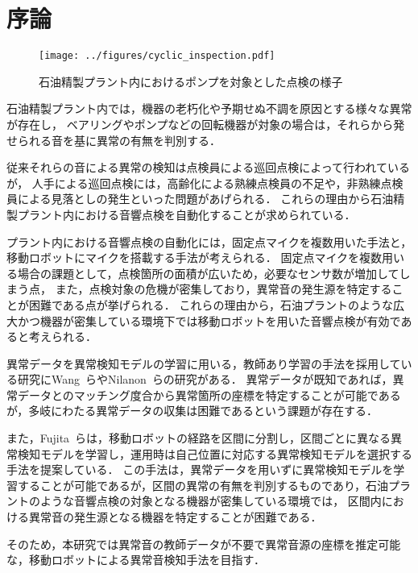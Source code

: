 \documentclass[../main]{subfiles}
\begin{document}
\graphicspath{{../figures/}}




\section{序論}

\begin{figure}[tb]
  \centering
  \texttt{[image: ../figures/cyclic\_inspection.pdf]}
  \caption{石油精製プラント内におけるポンプを対象とした点検の様子}
  \label{fig:cyclic_inspection}
\end{figure}

石油精製プラント内では，機器の老朽化や予期せぬ不調を原因とする様々な異常が存在し，
ベアリングやポンプなどの回転機器が対象の場合は，それらから発せられる音を基に異常の有無を判別する．




従来それらの音による異常の検知は点検員による巡回点検によって行われているが，
人手による巡回点検には，高齢化による熟練点検員の不足や，非熟練点検員による見落としの発生といった問題があげられる．
これらの理由から石油精製プラント内における音響点検を自動化することが求められている．


プラント内における音響点検の自動化には，固定点マイクを複数用いた手法と，移動ロボットにマイクを搭載する手法が考えられる．
固定点マイクを複数用いる場合の課題として，点検箇所の面積が広いため，必要なセンサ数が増加してしまう点，
また，点検対象の危機が密集しており，異常音の発生源を特定することが困難である点が挙げられる．
これらの理由から，石油プラントのような広大かつ機器が密集している環境下では移動ロボットを用いた音響点検が有効であると考えられる．

異常データを異常検知モデルの学習に用いる，教師あり学習の手法を採用している研究にWang~\cite{wang2022}らやNilanon~\cite{Nilanon2016}らの研究がある．
異常データが既知であれば，異常データとのマッチング度合から異常箇所の座標を特定することが可能であるが，多岐にわたる異常データの収集は困難であるという課題が存在する．


また，Fujita~\cite{fujita2023}らは，移動ロボットの経路を区間に分割し，区間ごとに異なる異常検知モデルを学習し，運用時は自己位置に対応する異常検知モデルを選択する手法を提案している．
この手法は，異常データを用いずに異常検知モデルを学習することが可能であるが，区間の異常の有無を判別するものであり，石油プラントのような音響点検の対象となる機器が密集している環境では，
区間内における異常音の発生源となる機器を特定することが困難である．

そのため，本研究では異常音の教師データが不要で異常音源の座標を推定可能な，移動ロボットによる異常音検知手法を目指す．
\end{document}
